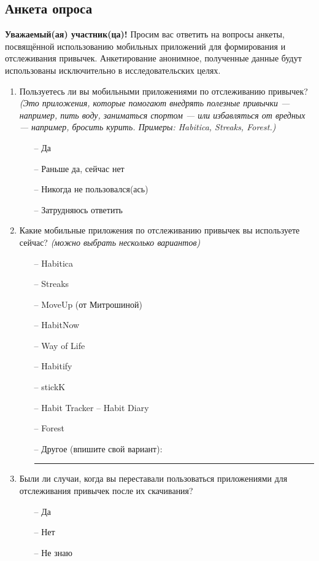 \documentclass[pdflatex,sn-mathphys-num]{sn-jnl}%
\theoremstyle{thmstyleone}%
\theoremstyle{thmstyletwo}%
\theoremstyle{thmstylethree}%
\begin{document}
\begin{appendices}

\section{Анкета опроса}\label{secA1}

\textbf{Уважаемый(ая) участник(ца)!}  
Просим вас ответить на вопросы анкеты, посвящённой использованию мобильных приложений для формирования и отслеживания привычек. Анкетирование анонимное, полученные данные будут использованы исключительно в исследовательских целях.

\vspace{1em}

\begin{enumerate}
  \item Пользуетесь ли вы мобильными приложениями по отслеживанию привычек?  
  \textit{(Это приложения, которые помогают внедрять полезные привычки — например, пить воду, заниматься спортом — или избавляться от вредных — например, бросить курить. Примеры: Habitica, Streaks, Forest.)}
  \begin{itemize}
    \item[–] Да
    \item[–] Раньше да, сейчас нет
    \item[–] Никогда не пользовался(ась)
    \item[–] Затрудняюсь ответить
  \end{itemize}

  \item Какие мобильные приложения по отслеживанию привычек вы используете сейчас? \textit{(можно выбрать несколько вариантов)}
  \begin{itemize}
    \item[–] Habitica
    \item[–] Streaks
    \item[–] MoveUp (от Митрошиной)
    \item[–] HabitNow
    \item[–] Way of Life
    \item[–] Habitify
    \item[–] stickK
    \item[–] Habit Tracker – Habit Diary
    \item[–] Forest
    \item[–] Другое (впишите свой вариант): \rule{0.6\linewidth}{0.4pt}
  \end{itemize}

  \item Были ли случаи, когда вы переставали пользоваться приложениями для отслеживания привычек после их скачивания?
  \begin{itemize}
    \item[–] Да
    \item[–] Нет
    \item[–] Не знаю
  \end{itemize}


\end{enumerate}
\end{appendices}
\end{document}
